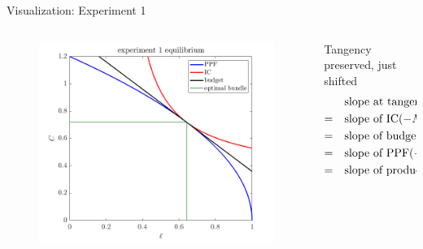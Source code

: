 \documentclass[11pt,aspectratio=169,usenames,dvipsnames]{beamer}
\begin{document}
\begin{frame}{Visualization: Experiment 1}
\label{slide:Visualization__Experiment_1}
    \begin{columns}
        \begin{column}{0.5\textwidth}
            \begin{figure}
                \includegraphics[width=\textwidth]{./figures/Exp1.png}
            \end{figure}
        \end{column}
        \begin{column}{0.5\textwidth}
            Tangency preserved, just \alert{shifted}
            \begin{align*}
                    & \text{slope at tangency } \alert{( C_{1}, l_{1} )}
                \\
                = \quad
                    & \text{slope of IC} (-MRS_{l, C})
                \\
                = \quad
                    & \text{slope of budget line} (-w)
                \\
                = \quad
                    & \text{slope of PPF} (-MRT_{l, C})
                \\
                = \quad
                    & \text{slope of production fcn} (-MPN)
            \end{align*}
        \end{column}
    \end{columns}
\end{frame}
\end{document}
